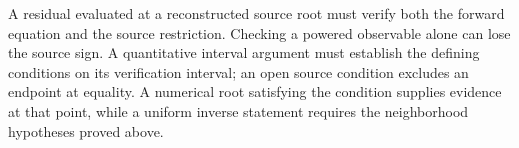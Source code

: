 A residual evaluated at a reconstructed source root must verify both the
forward equation and the source restriction. Checking a powered observable
alone can lose the source sign. A quantitative interval argument must
establish the defining conditions on its verification interval; an open
source condition excludes an endpoint at equality. A numerical root
satisfying the condition supplies evidence at that point, while a uniform
inverse statement requires the neighborhood hypotheses proved above.
